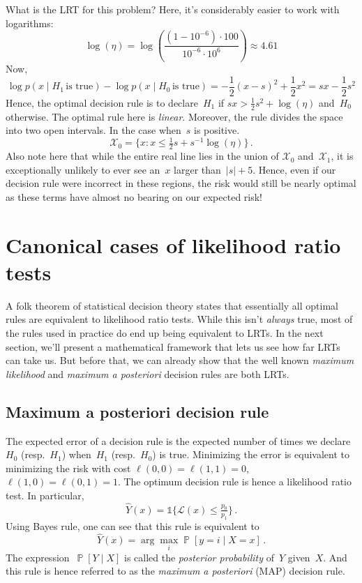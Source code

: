 \documentclass{tufte-book}
\begin{document}
What is the LRT for this problem? Here, it's considerably easier to work
with logarithms: \[
    \log(\eta) = \log\left( \frac{(1-10^{-6}) \cdot 100}{10^{-6} \cdot 10^{6}}\right) \approx 4.61
\] Now, \[
    \log p(x\mid H_1\,\text{is true})- \log p(x\mid H_0\,\text{is true}) =  -\frac{1}{2} (x-s)^2 + \frac{1}{2} x^2 = sx-\frac{1}{2}s^2
\] Hence, the optimal decision rule is to declare~\(H_1\) if
\(sx > \frac{1}{2}s^2+\log(\eta)\) and~\(H_0\) otherwise. The optimal
rule here is \emph{linear}. Moreover, the rule divides the space into
two open intervals. In the case when~\(s\) is positive. \[
    \mathcal{X}_0 = \{ x\colon x\leq  \tfrac{1}{2}s + s^{-1} \log(\eta)\}\,.
\] Also note here that while the entire real line lies in the union of
\(\mathcal{X}_0\) and~\(\mathcal{X}_1\), it is exceptionally unlikely to
ever see an~\(x\) larger than~\(|s|+5\). Hence, even if our decision
rule were incorrect in these regions, the risk would still be nearly
optimal as these terms have almost no bearing on our expected risk!

\hypertarget{canonical-cases-of-likelihood-ratio-tests}{%
\section{Canonical cases of likelihood ratio
tests}\label{canonical-cases-of-likelihood-ratio-tests}}

A folk theorem of statistical decision theory states that essentially
all optimal rules are equivalent to likelihood ratio tests. While this
isn't \emph{always} true, most of the rules used in practice do end up
being equivalent to LRTs. In the next section, we'll present a
mathematical framework that lets us see how far LRTs can take us. But
before that, we can already show that the well known \emph{maximum
likelihood} and \emph{maximum a posteriori} decision rules are both
LRTs.

\hypertarget{maximum-a-posteriori-decision-rule}{%
\subsection{Maximum a posteriori decision
rule}\label{maximum-a-posteriori-decision-rule}}

The expected error of a decision rule is the expected number of times we
declare~\(H_0\) (resp.~\(H_1\)) when~\(H_1\) (resp.~\(H_0\)) is true.
Minimizing the error is equivalent to minimizing the risk with cost
\(\ell(0,0)=\ell(1,1)=0\),~\(\ell(1,0)=\ell(0,1)=1\). The optimum
decision rule is hence a likelihood ratio test. In particular, \[
    \hat{Y}(x) =\mathbb{1}\{ \mathcal{L}(x) \leq \tfrac{p_0}{p_1}\}\,.
\] Using Bayes rule, one can see that this rule is equivalent to \[
    \hat{Y}(x) = \arg \max_i \mathop\mathbb{P}[y=i\mid X=x]\,.
\] The expression~\(\mathop\mathbb{P}[Y\mid X]\) is called the
\emph{posterior probability} of~\(Y\) given~\(X\). And this rule is
hence referred to as the \emph{maximum a posteriori} (MAP) decision
rule.
\end{document}
